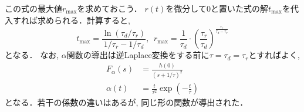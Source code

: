 この式の最大値$r_{\max}$を求めておこう． $r(t)$を微分して0と置いた式の解$t_{\max}$を代入すれば求められる．計算すると, 
\begin{equation}
t_{\max}=\dfrac{\ln(\tau_d/\tau_r)}{1/\tau_r-1/\tau_d},\ \ r_{\max}=\dfrac{1}{\tau_{d}}\cdot \left(\dfrac{\tau_{r}}{\tau_{d}}\right)^{\frac{\tau_{r}}{\tau_d-\tau_{r}}}    
\end{equation}
となる．
なお, $\alpha$関数の導出は逆Laplace変換をする前に$\tau=\tau_d=\tau_r$とすればよく, 
\begin{align}
F_\alpha(s)&=\frac{h(0)}{(s+1/\tau)^2}\\
\alpha(t)&=\frac{t}{\tau^2}\exp\left(-\frac{t}{\tau}\right)
\end{align}
となる．若干の係数の違いはあるが, 同じ形の関数が導出された． 
